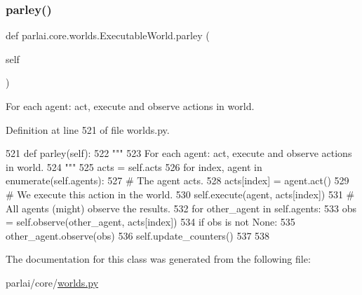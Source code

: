 \subsubsection{\texorpdfstring{parley()}{parley()}}
{\footnotesize\ttfamily def parlai.\+core.\+worlds.\+Executable\+World.\+parley (\begin{DoxyParamCaption}\item[{}]{self }\end{DoxyParamCaption})}

\begin{DoxyVerb}For each agent: act, execute and observe actions in world.
\end{DoxyVerb}
 

Definition at line 521 of file worlds.\+py.


\begin{DoxyCode}
521     \textcolor{keyword}{def }parley(self):
522         \textcolor{stringliteral}{"""}
523 \textcolor{stringliteral}{        For each agent: act, execute and observe actions in world.}
524 \textcolor{stringliteral}{        """}
525         acts = self.acts
526         \textcolor{keywordflow}{for} index, agent \textcolor{keywordflow}{in} enumerate(self.agents):
527             \textcolor{comment}{# The agent acts.}
528             acts[index] = agent.act()
529             \textcolor{comment}{# We execute this action in the world.}
530             self.execute(agent, acts[index])
531             \textcolor{comment}{# All agents (might) observe the results.}
532             \textcolor{keywordflow}{for} other\_agent \textcolor{keywordflow}{in} self.agents:
533                 obs = self.observe(other\_agent, acts[index])
534                 \textcolor{keywordflow}{if} obs \textcolor{keywordflow}{is} \textcolor{keywordflow}{not} \textcolor{keywordtype}{None}:
535                     other\_agent.observe(obs)
536         self.update\_counters()
537 
538 
\end{DoxyCode}


The documentation for this class was generated from the following file\+:\begin{DoxyCompactItemize}
\item 
parlai/core/\hyperlink{parlai_2core_2worlds_8py}{worlds.\+py}\end{DoxyCompactItemize}
